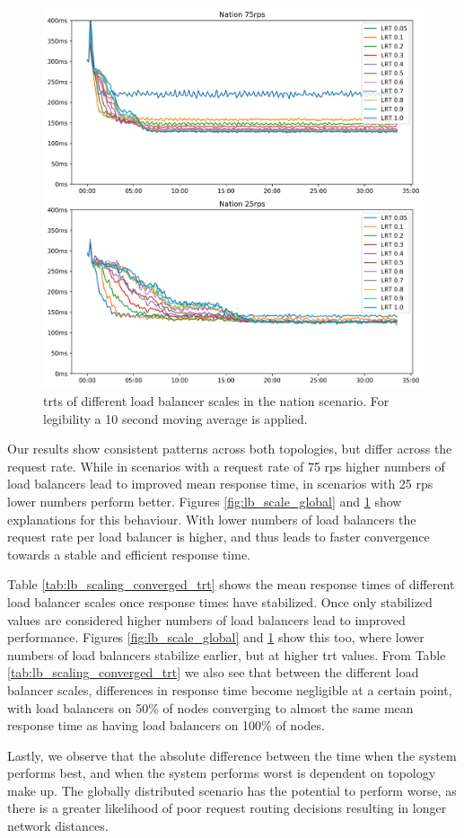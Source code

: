 \begin{figure}
    \centering
    \includegraphics[width=\linewidth]{graphics/graphs/nation_lb_scale.png}
    \caption{\glspl{trt} of different load balancer scales in the nation scenario. For legibility a 10 second moving average is applied.}
    \label{fig:lb_scale_nation}
\end{figure}

Our results show consistent patterns across both topologies, but differ across the request rate.
While in scenarios with a request rate of 75 \gls{rps} higher numbers of load balancers lead to improved mean response time, in scenarios with 25 \gls{rps} lower numbers perform better.
Figures \ref{fig:lb_scale_global} and \ref{fig:lb_scale_nation} show explanations for this behaviour.
With lower numbers of load balancers the request rate per load balancer is higher, and thus leads to faster convergence towards a stable and efficient response time.

Table \ref{tab:lb_scaling_converged_trt} shows the mean response times of different load balancer scales once response times have stabilized.
Once only stabilized values are considered higher numbers of load balancers lead to improved performance.
Figures \ref{fig:lb_scale_global} and \ref{fig:lb_scale_nation} show this too, where lower numbers of load balancers stabilize earlier, but at higher \gls{trt} values.
From Table \ref{tab:lb_scaling_converged_trt} we also see that between the different load balancer scales, differences in response time become negligible at a certain point, with load balancers on 50\% of nodes converging to almost the same mean response time as having load balancers on 100\% of nodes.

Lastly, we observe that the absolute difference between the time when the system performs best, and when the system performs worst is dependent on topology make up.
The globally distributed scenario has the potential to perform worse, as there is a greater likelihood of poor request routing decisions resulting in longer network distances.
